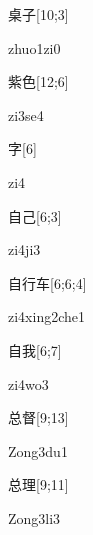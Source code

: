 \begin{verbete}[zhuo1zi0]{桌子}[10;3]
\begin{pronuncia}{zhuo1zi0}
\end{pronuncia}
\end{verbete}

\begin{verbete}[zi3se4]{紫色}[12;6]
\begin{pronuncia}{zi3se4}
\end{pronuncia}
\end{verbete}

\begin{verbete}[zi4]{字}[6]
\begin{pronuncia}{zi4}
\end{pronuncia}
\end{verbete}

\begin{verbete}[zi4ji3]{自己}[6;3]
\begin{pronuncia}{zi4ji3}
\end{pronuncia}
\end{verbete}

\begin{verbete}{自行车}[6;6;4]
\begin{pronuncia}{zi4xing2che1}
\end{pronuncia}
\end{verbete}

\begin{verbete}[zi4wo3]{自我}[6;7]
\begin{pronuncia}{zi4wo3}
\end{pronuncia}
\end{verbete}

\begin{verbete}[Zong3du1]{总督}[9;13]
\begin{pronuncia}{Zong3du1}
\end{pronuncia}
\end{verbete}

\begin{verbete}[Zong3li3]{总理}[9;11]
\begin{pronuncia}{Zong3li3}
\end{pronuncia}
\end{verbete}

